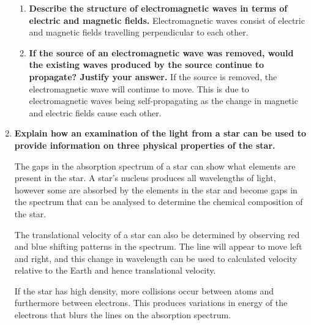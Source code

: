 \documentclass{report}
\begin{document}
\begin{enumerate}
\begin{enumerate}
					\item \textbf{Describe the structure of electromagnetic waves in terms of electric and magnetic fields.}
						\subitem Electromagnetic waves consist of electric and magnetic fields travelling perpendicular to each other.

					\item \textbf{If the source of an electromagnetic wave was removed, would the existing waves produced by the source continue to propagate? Justify your answer.}
						\subitem If the source is removed, the electromagnetic wave will continue to move. This is due to electromagnetic waves being self-propagating as the change in magnetic and electric fields cause each other.
				\end{enumerate}

			\item \textbf{Explain how an examination of the light from a star can be used to provide information on three physical properties of the star.}

				\subitem The gaps in the absorption spectrum of a star can show what elements are present in the star. A star's nucleus produces all wavelengths of light, however some are absorbed by the elements in the star and become gaps in the spectrum that can be analysed to determine the chemical composition of the star.

				The translational velocity of a star can also be determined by observing red and blue shifting patterns in the spectrum. The line will appear to move left and right, and this change in wavelength can be used to calculated velocity relative to the Earth and hence translational velocity.

				If the star has high density, more collisions occur between atoms and furthermore between electrons. This produces variations in energy of the electrons that blurs the lines on the absorption spectrum.
		\end{enumerate}
\end{document}
